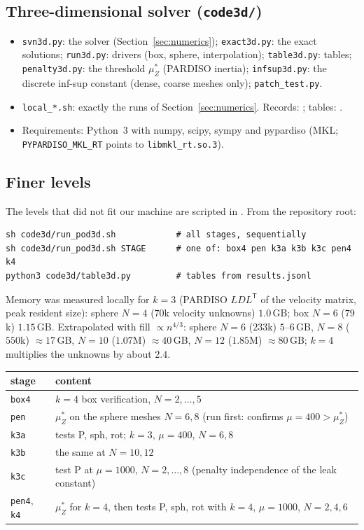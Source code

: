 \subsection*{Three-dimensional solver (\texttt{code3d/})}
\begin{itemize}
\item \texttt{svn3d.py}: the solver (Section~\ref{sec:numerics}); \texttt{exact3d.py}: the exact solutions; \texttt{run3d.py}: drivers (box, sphere, interpolation); \texttt{table3d.py}: tables; \texttt{penalty3d.py}: the threshold $\mu_Z^\ast$ (PARDISO inertia); \texttt{infsup3d.py}: the discrete inf-sup constant (dense, coarse meshes only); \texttt{patch\_test.py}.
\item \texttt{local\_*.sh}: exactly the runs of Section~\ref{sec:numerics}. Records: ; tables: .
\item Requirements: Python~3 with numpy, scipy, sympy and pypardiso (MKL; \texttt{PYPARDISO\_MKL\_RT} points to \texttt{libmkl\_rt.so.3}).
\end{itemize}

\subsection*{Finer levels}
The levels that did not fit our machine are scripted in . From the repository root:
\begin{verbatim}
sh code3d/run_pod3d.sh            # all stages, sequentially
sh code3d/run_pod3d.sh STAGE      # one of: box4 pen k3a k3b k3c pen4 k4
python3 code3d/table3d.py         # tables from results.jsonl
\end{verbatim}
Memory was measured locally for $k=3$ (PARDISO $LDL^{\mathsf T}$ of the velocity matrix, peak resident size): sphere $N=4$ ($70$k velocity unknowns) $1.0$\,GB; box $N=6$ ($79$k) $1.15$\,GB. Extrapolated with fill $\propto n^{4/3}$: sphere $N=6$ ($233$k) $5$--$6$\,GB, $N=8$ ($550$k) $\approx17$\,GB, $N=10$ ($1.07$M) $\approx40$\,GB, $N=12$ ($1.85$M) $\approx80$\,GB; $k=4$ multiplies the unknowns by about $2.4$.
\begin{center}\small
\begin{tabular}{ll}
\toprule
stage & content\\
\midrule
\texttt{box4} & $k=4$ box verification, $N=2,\dots,5$\\
\texttt{pen} & $\mu_Z^\ast$ on the sphere meshes $N=6,8$ (run first: confirms $\mu=400>\mu_Z^\ast$)\\
\texttt{k3a} & tests P, sph, rot; $k=3$, $\mu=400$, $N=6,8$\\
\texttt{k3b} & the same at $N=10,12$\\
\texttt{k3c} & test P at $\mu=1000$, $N=2,\dots,8$ (penalty independence of the leak constant)\\
\texttt{pen4}, \texttt{k4} & $\mu_Z^\ast$ for $k=4$, then tests P, sph, rot with $k=4$, $\mu=1000$, $N=2,4,6$\\
\bottomrule
\end{tabular}
\end{center}
